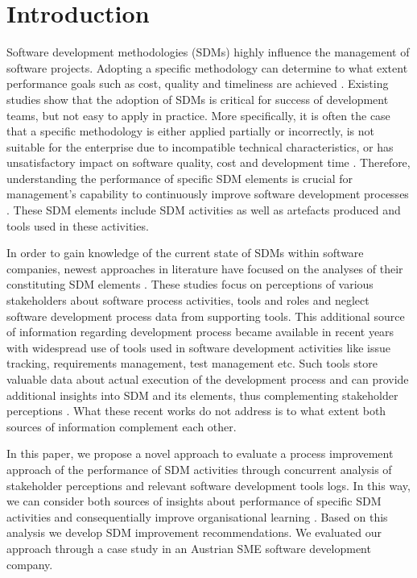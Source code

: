 \section{Introduction}


Software development methodologies (SDMs) highly influence the management of software projects. Adopting a specific methodology can determine to what extent performance goals such as cost, quality and timeliness are achieved \citep{DBLP:journals/bise/VavpoticRH20}.  Existing studies show \citep{kneuper2008cmmi,Loon2007,DBLP:conf/enase/LaporteOP15a} that the adoption of SDMs is critical for success of development teams, but not easy to apply in practice. More specifically, it is often the case that a specific methodology is either applied partially or incorrectly, is not suitable for the enterprise due to incompatible technical characteristics, or has unsatisfactory impact on software quality, cost and development time \citep{DBLP:journals/dss/ChanT09,balasubramanian2016evaluation}.  Therefore, understanding the performance of specific SDM elements is crucial for management’s capability to continuously improve software development processes \citep{DBLP:journals/comsis/VavpoticH12}. These SDM elements include SDM activities as well as artefacts produced and tools used in these activities. 


In order to gain knowledge of the current state of SDMs within software companies, newest approaches in literature have focused on the analyses of their constituting SDM elements  \citep{hovelja2015exploring,DBLP:journals/infsof/VavpoticB09,gill2018scaling}. These studies focus on perceptions of various stakeholders about software process activities, tools and roles and neglect software development process data from supporting tools. This additional source of information regarding development process became available in recent years with widespread use of tools used in software development activities like issue tracking, requirements management, test management etc. Such tools store valuable data about actual execution of the development process and can provide additional insights into SDM and its elements, thus complementing stakeholder perceptions \citep{DBLP:journals/ese/ChoetkiertikulD17,DBLP:conf/msr/MantylaADGO16,DBLP:journals/peerj-cs/DestefanisOCSMT16,DBLP:conf/icse/OrtuDKM15}. What these recent works do not address is to what extent both sources of information complement each other.


In this paper, we propose a novel approach to evaluate a process improvement approach of the performance of SDM activities through concurrent analysis of stakeholder perceptions and relevant software development tools logs. In this way, we can consider both sources of insights about performance of specific SDM activities and consequentially improve organisational learning \citep{annosi2020learning}. Based on this analysis we develop SDM improvement recommendations. We evaluated our approach through a case study in an Austrian SME software development company. 

